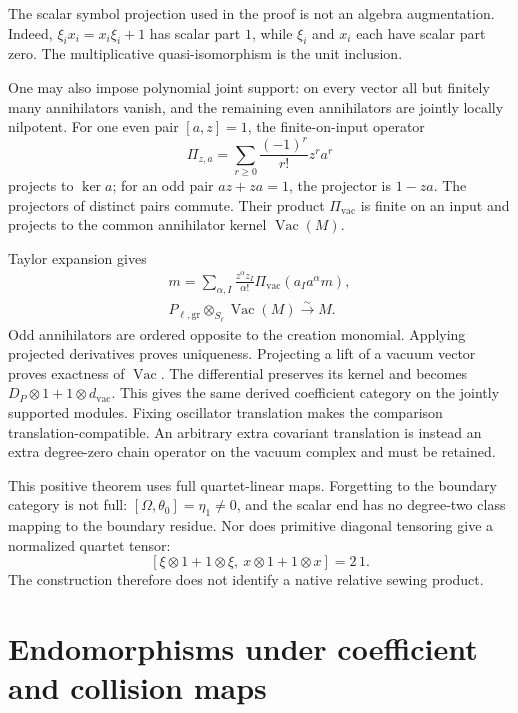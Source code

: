The scalar symbol projection used in the proof is not an
algebra augmentation. Indeed,
\(\xi_i x_i=x_i\xi_i+1\) has scalar part \(1\), while
\(\xi_i\) and \(x_i\) each have scalar part zero.
The multiplicative quasi-isomorphism is the unit inclusion.

One may also impose polynomial joint support: on every
vector all but finitely many annihilators vanish, and the
remaining even annihilators are jointly locally nilpotent.
For one even pair \([a,z]=1\), the finite-on-input operator
\[
 \Pi_{z,a}=\sum_{r\ge0}\frac{(-1)^r}{r!}z^ra^r
\]
projects to \(\ker a\); for an odd pair \(az+za=1\),
the projector is \(1-za\). The projectors of distinct
pairs commute. Their product \(\Pi_{\mathrm{vac}}\) is
finite on an input and projects to the common annihilator
kernel \(\operatorname{Vac}(M)\).

Taylor expansion gives
\[
 \begin{gathered}
 m=\sum_{\alpha,I}\frac{z^\alpha z_I}{\alpha!}
         \Pi_{\mathrm{vac}}(a_Ia^\alpha m),\\
 P_{\ell,\mathrm{gr}}\otimes_{S_\ell}\operatorname{Vac}(M)
       \xrightarrow{\sim}M.
 \end{gathered}
\]
Odd annihilators are ordered opposite to the creation monomial.
Applying projected derivatives proves uniqueness. Projecting
a lift of a vacuum vector proves exactness of
\(\operatorname{Vac}\). The differential preserves its kernel
and becomes \(D_P\otimes1+1\otimes d_{\mathrm{vac}}\).
This gives the same derived coefficient category on the
jointly supported modules. Fixing oscillator translation
makes the comparison translation-compatible. An arbitrary
extra covariant translation is instead an extra degree-zero
chain operator on the vacuum complex and must be retained.

This positive theorem uses full quartet-linear maps.
Forgetting to the boundary category is not full:
\([\Omega,\theta_0]=\eta_1\ne0\), and the scalar end has
no degree-two class mapping to the boundary residue.
Nor does primitive diagonal tensoring give a normalized
quartet tensor:
\[
 [\xi\otimes1+1\otimes\xi,\ x\otimes1+1\otimes x]
       =2\,1.
\]
The construction therefore does not identify a native
relative sewing product.

\section{Endomorphisms under coefficient and collision maps}
\label{sec:vol2-marked-base-change}

